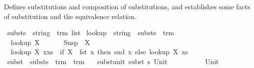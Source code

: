 %
\begin{isabellebody}%
%
%
\isadelimtheory
%
\endisadelimtheory
%
\isatagtheory
%
\endisatagtheory
{\isafoldtheory}%
%
\isadelimtheory
%
\endisadelimtheory
%
\isadelimdocument
%
\endisadelimdocument
%
\isatagdocument
%
\isamarkuptrue%
%
\endisatagdocument
{\isafolddocument}%
%
\isadelimdocument
%
\endisadelimdocument
%
\begin{isamarkuptext}%
Defines substitutions and composition of substitutions, and establishes some 
  facts of substitution and the equivalence relation.%
\end{isamarkuptext}\isamarkuptrue%
\isamarkupfalse%
\ substs\ {\isacharequal}{\kern0pt}\ {\isachardoublequoteopen}{\isacharparenleft}{\kern0pt}string\ {\isasymtimes}\ trm{\isacharparenright}{\kern0pt}\ list{\isachardoublequoteclose}\isanewline
\isanewline
{}\isamarkupfalse%
\ look{\isacharunderscore}{\kern0pt}up\ {\isacharcolon}{\kern0pt}{\isacharcolon}{\kern0pt}\ {\isachardoublequoteopen}string\ {\isasymRightarrow}\ substs\ {\isasymRightarrow}\ trm{\isachardoublequoteclose}\ \isanewline
\ \ {\isachardoublequoteopen}look{\isacharunderscore}{\kern0pt}up\ X\ {\isacharbrackleft}{\kern0pt}{\isacharbrackright}{\kern0pt}\ \ \ \ \ {\isacharequal}{\kern0pt}\ Susp\ {\isacharbrackleft}{\kern0pt}{\isacharbrackright}{\kern0pt}\ X{\isachardoublequoteclose}\ {\isacharbar}{\kern0pt}\isanewline
\ \ {\isachardoublequoteopen}look{\isacharunderscore}{\kern0pt}up\ X\ {\isacharparenleft}{\kern0pt}x{\isacharhash}{\kern0pt}xs{\isacharparenright}{\kern0pt}\ {\isacharequal}{\kern0pt}\ {\isacharparenleft}{\kern0pt}if\ {\isacharparenleft}{\kern0pt}X\ {\isacharequal}{\kern0pt}\ fst\ x{\isacharparenright}{\kern0pt}\ then\ {\isacharparenleft}{\kern0pt}snd\ x{\isacharparenright}{\kern0pt}\ else\ look{\isacharunderscore}{\kern0pt}up\ X\ xs{\isacharparenright}{\kern0pt}{\isachardoublequoteclose}\isanewline
\isanewline
{}\isamarkupfalse%
\ subst\ {\isacharcolon}{\kern0pt}{\isacharcolon}{\kern0pt}\ {\isachardoublequoteopen}substs\ {\isasymRightarrow}\ trm\ {\isasymRightarrow}\ trm{\isachardoublequoteclose}\ \isanewline
\ \ subst{\isacharunderscore}{\kern0pt}unit{\isacharcolon}{\kern0pt}\ {\isachardoublequoteopen}subst\ s\ {\isacharparenleft}{\kern0pt}Unit{\isacharparenright}{\kern0pt}\ \ \ \ \ \ \ \ \ \ {\isacharequal}{\kern0pt}\ Unit{\isachardoublequoteclose}\ {\isacharbar}{\kern0pt}\isanewline

\end{isabellebody}
